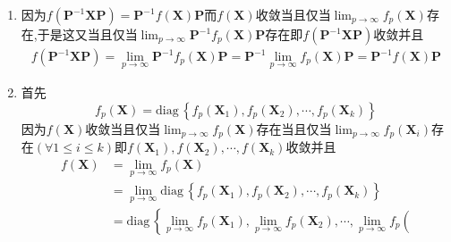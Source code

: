 \begin{formal}
\begin{Proof}
        \begin{enumerate}[label={\textup{(\arabic*)}}]
            \item 因为$f\left(
                \bm{P}^{-1}\bm{X}\bm{P}
            \right)=
            \bm{P}^{-1}f\left(\bm{X}\right)\bm{P}
            $而$f\left(\bm{X}\right)$收敛当且仅当$\displaystyle \lim_{p\to\infty}f_p\left(\bm{X}\right)$存在,于是这又当且仅当$\displaystyle \lim_{p\to\infty}\bm{P}^{-1}f_p\left(\bm{X}\right)\bm{P}$存在即$f\left(
                \bm{P}^{-1}\bm{X}\bm{P}
            \right)$收敛并且\begin{align*}
                f\left(
                    \bm{P}^{-1}\bm{X}\bm{P}
                \right)=\lim_{p\to\infty}\bm{P}^{-1}f_p\left(\bm{X}\right)\bm{P}=\bm{P}^{-1}\lim_{p\to\infty}f_p\left(\bm{X}\right)\bm{P}=\bm{P}^{-1}f\left(\bm{X}\right)\bm{P}
            \end{align*}
            \item 首先\[
            f_p\left(\bm{X}\right)=\mathrm{diag}\,\left\{
                f_p\left(
                    \bm{X}_1
                \right),f_p\left(
                    \bm{X}_2
                \right),\cdots,f_p\left(
                    \bm{X}_k
                \right)
            \right\}
            \]因为$f\left(\bm{X}\right)$收敛当且仅当$\displaystyle \lim_{p\to\infty}f_p\left(\bm{X}\right)$存在当且仅当$\displaystyle \lim_{p\to\infty}f_p\left(
                \bm{X}_i
                \right)$存在$\left(\forall 
                    1\leqslant i\leqslant k
                \right)$即$f\left(
                    \bm{X}_1
                \right),f\left(
                    \bm{X}_2
                \right),\cdots,f\left(
                    \bm{X}_k
                \right)$收敛并且\begin{align*}
                    f\left(\bm{X}\right)&=\lim_{p\to\infty}f_p\left(\bm{X}\right)\\
                    &=\lim_{p\to\infty}\mathrm{diag}\,\left\{
                        f_p\left(
                            \bm{X}_1
                        \right),f_p\left(
                            \bm{X}_2
                        \right),\cdots,f_p\left(
                            \bm{X}_k
                        \right)
                    \right\}\\
                    &=\mathrm{diag}\,\left\{
                        \lim_{p\to\infty}f_p\left(
                            \bm{X}_1
                        \right),\lim_{p\to\infty}f_p\left(
                            \bm{X}_2
                        \right),\cdots,\lim_{p\to\infty}f_p\left(

\end{align*}
\end{enumerate}
\end{Proof}
\end{formal}
